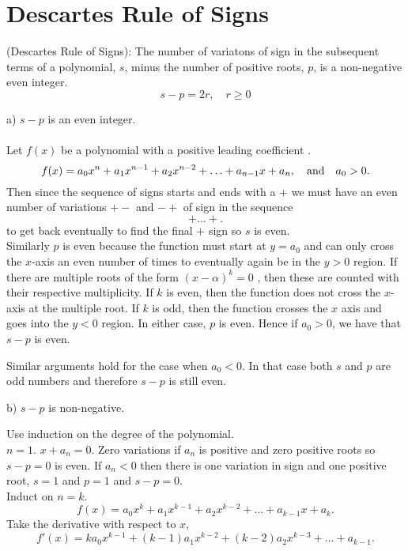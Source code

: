 \section{Descartes Rule of Signs}

\begin{theorem}{(Descartes Rule of Signs):}
The number of variatons of sign in the subsequent terms of a polynomial, $s$, minus the number of positive roots, $p$, is a non-negative even integer.\\
$$s-p = 2r, \quad r\ge 0$$ 
\end{theorem}


a) $s-p$ is an even integer.\\ \\
Let $f(x)$ be a polynomial with a positive leading coefficient . \[ f(x) = a_0 x^n + a_1 x^{n-1} + a_2 x^{n-2} + \hdots + a_{n-1} x + a_n, \quad \hbox{and~~~}  a_0 > 0. \]
Then since the sequence of signs starts and ends with a $+$ we must have an even number of variations $+-$ and $-+$ of sign in the sequence $$+\hdots+.$$ to get back eventually to find the final $+$ sign so $s$ is even.\\

Similarly $p$ is even because the function must start at $y=a_0$ and can only cross the $x$-axis an even number of times to eventually again be in the $y>0$ region. If there are multiple roots of the form $(x-\alpha)^k = 0$ , then these are counted with their respective multiplicity. If $k$ is even, then the function does not cross the $x$-axis at the multiple root. If $k$ is odd, then the function crosses the $x$ axis and goes into the $y<0$ region. In either case, $p$ is even. Hence if $a_0 > 0$, we have that $s-p$ is even. 

Similar arguments hold for the case when $a_0<0$. In that case both $s$ and $p$ are odd numbers and therefore $s-p$ is still even.  


b) $s-p$ is non-negative. 

Use induction on the degree of the polynomial.\\
$n=1$. $x + a_n = 0$. Zero variations if $a_n$ is positive and zero positive roots so $s-p = 0$ is even. If $a_n < 0$ then there is one variation in sign and one positive root, $s=1$ and $p=1$ and $s-p=0$.\\

Induct on $n = k$.  \[ f(x) = a_0 x^k + a_1 x^{k-1} + a_2 x^{k-2} + \hdots + a_{k-1} x + a_k. \] Take the derivative with respect to $x$,
\[ f'(x) = ka_0 x^{k-1} + (k-1)a_1 x^{k-2} + (k-2)a_2 x^{k-3} + \hdots + a_{k-1}. \] 

